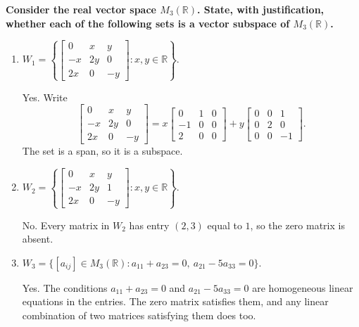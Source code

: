\providecommand{\rank}{\operatorname{r}}
\providecommand{\RR}{\mathbb R}
\providecommand{\CC}{\mathbb C}
\providecommand{\KK}{\mathbb K}

\setcounter{enumi}{61}
\item {\bfseries\boldmath
Consider the real vector space $M_3(\RR)$. State, with justification, whether each of the following sets is a vector subspace of $M_3(\RR)$.
}

\begin{enumerate}[label=\alph*)]

\item $W_1=\left\{\begin{bmatrix}0&x&y\\-x&2y&0\\2x&0&-y\end{bmatrix}:x,y\in\RR\right\}$.

\begin{answer}
Yes. Write
\[
 \begin{bmatrix}0&x&y\\-x&2y&0\\2x&0&-y\end{bmatrix}
 =x\begin{bmatrix}0&1&0\\-1&0&0\\2&0&0\end{bmatrix}
 +y\begin{bmatrix}0&0&1\\0&2&0\\0&0&-1\end{bmatrix}.
\]
The set is a span, so it is a subspace.
\end{answer}

\item $W_2=\left\{\begin{bmatrix}0&x&y\\-x&2y&1\\2x&0&-y\end{bmatrix}:x,y\in\RR\right\}$.

\begin{answer}
No. Every matrix in $W_2$ has entry $(2,3)$ equal to $1$, so the zero matrix is absent.
\end{answer}

\item $W_3=\{[a_{ij}]\in M_3(\RR):a_{11}+a_{23}=0,\ a_{21}-5a_{33}=0\}$.

\begin{answer}
Yes. The conditions $a_{11}+a_{23}=0$ and $a_{21}-5a_{33}=0$ are
homogeneous linear equations in the entries. The zero matrix satisfies them,
and any linear combination of two matrices satisfying them does too.
\end{answer}


\end{enumerate}
